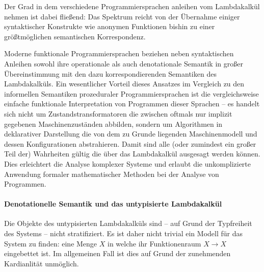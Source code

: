 Der Grad in dem verschiedene Programmiersprachen anleihen vom Lambdakalkül 
nehmen ist dabei fließend: 
Das Spektrum reicht von der Übernahme einiger syntaktischer Konstrukte 
wie anonymen Funktionen bishin zu einer größtmöglichen semantischen 
Korrespondenz.

Moderne funktionale Programmiersprachen beziehen neben syntaktischen Anleihen
sowohl ihre operationale als auch denotationale Semantik in großer 
Übereinstimmung mit den dazu korrespondierenden Semantiken des Lambdakalküls.
Ein wesentlicher Vorteil dieses Ansatzes im Vergleich zu den informellen 
Semantiken prozeduraler Programmiersprachen ist die 
vergleichsweise einfache funktionale Interpretation von Programmen 
dieser Sprachen -- es handelt sich nicht um Zustandstransformatoren
die zwischen oftmals nur implizit gegebenen Maschinenzuständen abbilden,
sondern um Algorithmen in deklarativer Darstellung die von dem
zu Grunde liegenden Maschinenmodell und dessen Konfigurationen abstrahieren.
Damit sind alle (oder zumindest ein großer Teil der) Wahrheiten gültig 
die über das Lambdakalkül ausgesagt werden können.
Dies erleichtert die Analyse komplexer Systeme und erlaubt die unkomplizierte
Anwendung formaler mathematischer Methoden bei der Analyse von Programmen.



\begin{comment}
Dieser Teil behandelt eine Übersicht über die denotationelle Semantik 
des Lambdakalküls ... vll. besser an eine andere Stelle 
\end{comment}

\paragraph{Denotationelle Semantik und das untypisierte Lambdakalkül}
Die Objekte des untypisierten Lambdakalküls sind -- 
auf Grund der Typfreiheit des Systems -- nicht stratifiziert.
Es ist daher nicht trivial ein Modell für das System zu finden: %
eine Menge $X$ in welche ihr Funktionenraum $X → X$ eingebettet ist.
Im allgemeinen Fall ist dies auf Grund der zunehmenden Kardianlität unmöglich.

